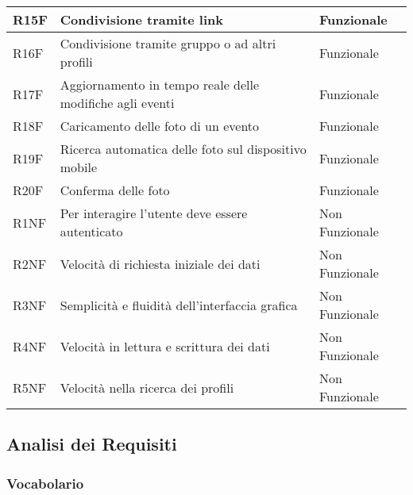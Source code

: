 \begin{tabular} {|P{1.5cm}|P{12.5cm}|P{3cm}|}
  \hline
  R15F        & Condivisione tramite link                                                   & Funzionale     \\
  \hline
  R16F        & Condivisione tramite gruppo o ad altri profili                              & Funzionale     \\
  \hline
  R17F        & Aggiornamento in tempo reale delle modifiche agli eventi                    & Funzionale     \\
  \hline
  R18F        & Caricamento delle foto di un evento                                         & Funzionale     \\
  \hline
  R19F        & Ricerca automatica delle foto sul dispositivo mobile                        & Funzionale     \\
  \hline
  R20F        & Conferma delle foto                                                         & Funzionale     \\
  \hline
  R1NF        & Per interagire l’utente deve essere autenticato                             & Non Funzionale \\
  \hline
  R2NF        & Velocità di richiesta iniziale dei dati                                     & Non Funzionale \\
  \hline
  R3NF        & Semplicità e fluidità dell'interfaccia grafica                              & Non Funzionale \\
  \hline
  R4NF        & Velocità in lettura e scrittura dei dati                                    & Non Funzionale \\
  \hline
  R5NF        & Velocità nella ricerca dei profili                                          & Non Funzionale \\
  \hline
\end{tabular}

\subsection{Analisi dei Requisiti}
\subsubsection{Vocabolario}

